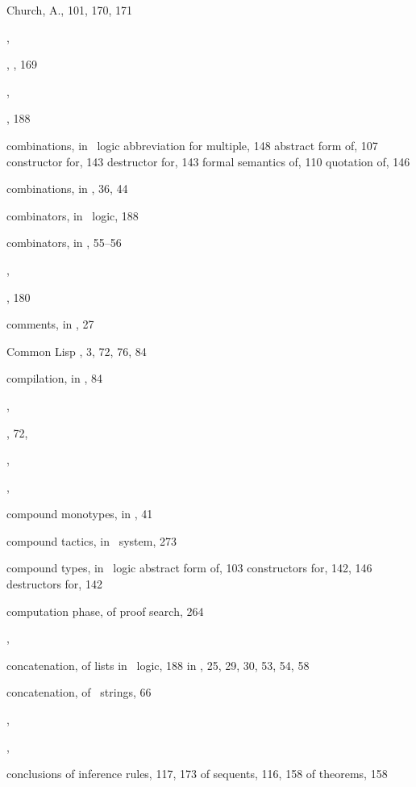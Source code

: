 \begin{theindex}
  \item Church, A., 101, 170, 171
  \item {}, 
  \item {}, , 169
  \item {}, 
  \item {}, 188
  \item combinations, in \HOL\ logic
    \subitem abbreviation for multiple, 148
    \subitem abstract form of, 107
    \subitem constructor for, 143
    \subitem destructor for, 143
    \subitem formal semantics of, 110
    \subitem quotation of, 146
  \item combinations, in \ML, 36, 44
  \item combinators, in \HOL\ logic, 188
  \item combinators, in \ML, 55--56
  \item {}, 
  \item {}, 180
  \item comments, in \ML, 27
  \item Common Lisp \HOL, 3, 72, 76, 84
  \item compilation, in \ML, 84
  \item {}, 
  \item {}, 72, 
  \item {}, 
  \item {}, 
  \item compound monotypes, in \ML, 41
  \item compound tactics, in \HOL\ system, 273
  \item compound types, in \HOL\ logic
    \subitem abstract form of, 103
    \subitem constructors for, 142, 146
    \subitem destructors for, 142
  \item computation phase, of proof search, 264
  \item {}, 
  \item concatenation, of lists
    \subitem in \HOL\ logic, 188
    \subitem in \ML, 25, 29, 30, 53, 54, 58
  \item concatenation, of \ML\ strings, 66
  \item {}, 
  \item {}, 
  \item conclusions
    \subitem of inference rules, 117, 173
    \subitem of sequents, 116, 158
    \subitem of theorems, 158

\end{theindex}
